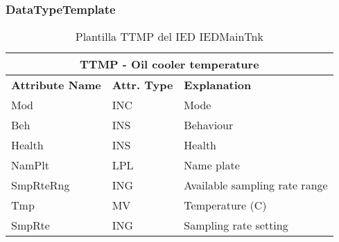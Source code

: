     \subsubsection{DataTypeTemplate}
    \begin{table}[H]
    \begin{center}
    \begin{tabular}{|l|l|p{8.5cm}|}
            \hline
            \multicolumn{3}{|c|}{\cellcolor[gray]{0.8} \textbf{ TTMP}  - Oil cooler temperature} \\
            \hline
            \textbf{Attribute Name} & \textbf{Attr. Type} & \textbf{Explanation} \\
            \hline 
            Mod & INC & Mode \\
            \hline
            Beh & INS & Behaviour \\
            \hline
            Health & INS & Health \\
            \hline
            NamPlt & LPL & Name plate \\
            \hline
            SmpRteRng & ING & Available sampling rate range \\
            \hline
            Tmp & MV & Temperature (C) \\
            \hline
            SmpRte & ING & Sampling rate setting \\
            \hline
    \end{tabular}
    \caption{Plantilla TTMP del IED IEDMainTnk}
    \label{table:lnTypeTTMP_6}
    \end{center}
    \end{table}
    
    
    